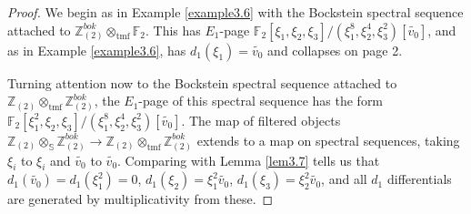 \documentclass[11pt,leqno]{article}
\newcommand{\zz}{\mathbb{Z}}
\newcommand{\sss}{\mathbb{S}}
\newcommand{\fff}{\mathbb{F}}
\DeclareMathOperator{\tmf}{tmf}
\newtheorem*{short hand}{theorem name}
\theoremstyle{plain}  %
\theoremstyle{definition}
\numberwithin{equation}{section}
\begin{document}
\begin{proof}
We begin as in Example \ref{example3.6} with the Bockstein spectral sequence attached to $\zz_{(2)}^{bok}\otimes_{\tmf}\fff_2$.  This has $E_1$-page $\fff_2[\xi_1,\xi_2,\xi_3]/(\xi_1^8,\xi_2^4,\xi_3^2)[\tilde{v_0}]$, and as in Example \ref{example3.6}, has $d_1(\xi_1)=\tilde{v_0}$ and collapses on page 2.  

Turning attention now to the Bockstein spectral sequence attached to $\zz_{(2)}\otimes_{\tmf}\zz_{(2)}^{bok}$, the $E_1$-page of this spectral sequence has the form $\fff_2[\xi_1^2,\xi_2,\xi_3]/(\xi_1^{8},\xi_2^4,\xi_3^2)[\tilde{v_0}]$.  The map of filtered objects $\zz_{(2)}\otimes_{\sss}\zz_{(2)}^{bok} \to \zz_{(2)}\otimes_{\tmf} \zz_{(2)}^{bok}$ extends to a map on spectral sequences, taking $\xi_i$ to $\xi_i$ and $\tilde{v_0}$ to $\tilde{v_0}$.  Comparing with Lemma \ref{lem3.7} tells us that $d_1(\tilde{v_0})=d_1(\xi_1^2)=0$, $d_1(\xi_2)=\xi_1^2\tilde{v_0}$, $d_1(\xi_3)=\xi_2^2\tilde{v_0}$, and all $d_1$ differentials are generated by multiplicativity from these.


\end{proof}
\end{document}
